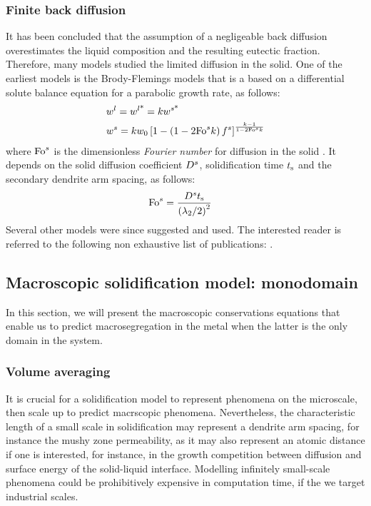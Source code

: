 \subsubsection*{Finite back diffusion}
It has been concluded that the assumption of a negligeable back diffusion overestimates the liquid composition
and the resulting eutectic fraction. Therefore, many models studied the limited diffusion in the solid. One of the earliest models is the Brody-Flemings models \citep{khan_influence_2014} that is a based on a differential solute balance equation for a parabolic growth rate, as follows:
\begin{align}
\label{eq:brodyflemings}
& {w}^l= {w}^{l \text{*}}  = k {w}^{s \text{*}}  \\
& {w}^s= k {w}_0 \left[  1 - \left(  1 - 2 \text{Fo}^s k  \right) {f^s}  \right]^{\frac{k-1}{1 - 2 \text{Fo}^s k }}
\end{align}
where $\text{Fo}^s$ is the dimensionless \emph{Fourier number} for diffusion in the solid \citep{dantzig_solidification_2009}. It depends on the 
solid diffusion coefficient $D^s$, solidification time $t_\text{s}$ and the secondary dendrite arm spacing, as follows: 
\begin{align}
\label{eq:fouriersolid}
& \text{Fo}^s = \frac{D^s t_\text{s}}{\left( {\lambda}_{2} / 2 \right)^2}
\end{align}
Several other models were since suggested and used. The interested reader is referred to the following non exhaustive list of publications: \citet{clyne_solute_1981,kobayashi_solute_1988,ni_volume-averaged_1991,wang_multiphase_1993,combeau_modeling_1996,martorano_solutal_2003,tourret_generalized_2009}.
%
%
\subsection{Macroscopic solidification model: monodomain}
In this section, we will present the macroscopic conservations equations that enable us to predict 
macrosegregation in the metal when the latter is the only domain in the system.
%
%
\subsubsection{Volume averaging}
It is crucial for a solidification model to represent phenomena on the microscale, then scale up to predict 
macrscopic phenomena. Nevertheless, the characteristic length of a small scale in solidification may represent a dendrite arm spacing, for instance the mushy zone permeability, as it may also represent an atomic distance if one is interested, for instance, in the growth competition between diffusion and surface energy of the solid-liquid interface. Modelling infinitely small-scale phenomena could be prohibitively expensive in computation time, if the we target industrial scales. 


